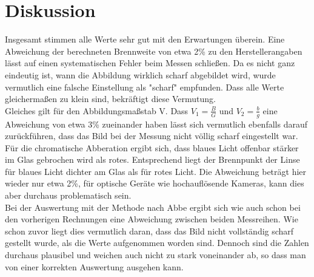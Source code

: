 \section{Diskussion}
Insgesamt stimmen alle Werte sehr gut mit den Erwartungen überein. Eine Abweichung der berechneten Brennweite von etwa 2\% zu den Herstellerangaben lässt auf einen systematischen Fehler beim Messen schließen. Da es nicht ganz eindeutig ist, wann die Abbildung wirklich scharf abgebildet wird, wurde vermutlich eine falsche Einstellung als "scharf" empfunden. Dass alle Werte gleichermaßen zu klein sind, bekräftigt diese Vermutung.\\
Gleiches gilt für den Abbildungsmaßstab V. Dass $V_1 = \frac{B}{G}$ und $V_2 = \frac{b}{g}$ eine Abweichung von etwa 3\% zueinander haben lässt sich vermutlich ebenfalls darauf zurückführen, dass das Bild bei der Messung nicht völlig scharf eingestellt war.\\
Für die chromatische Abberation ergibt sich, dass blaues Licht offenbar stärker im Glas gebrochen wird als rotes. Entsprechend liegt der Brennpunkt der Linse für blaues Licht dichter am Glas als für rotes Licht. Die Abweichung beträgt hier wieder nur etwa 2\%, für optische Geräte wie hochauflösende Kameras, kann dies aber durchaus problematisch sein.\\
Bei der Auswertung mit der Methode nach Abbe ergibt sich wie auch schon bei den vorherigen Rechnungen eine Abweichung zwischen beiden Messreihen. Wie schon zuvor liegt dies vermutlich daran, dass das Bild nicht vollständig scharf gestellt wurde, als die Werte aufgenommen worden sind. Dennoch sind die Zahlen durchaus plausibel und weichen auch nicht zu stark voneinander ab, so dass man von einer korrekten Auswertung ausgehen kann.





